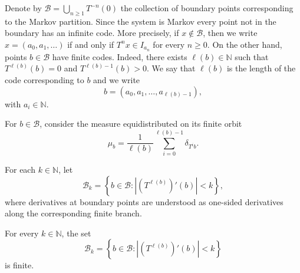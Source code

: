 \documentclass[letterpaper,11pt]{amsart}
\numberwithin{equation}{section}     %
\newcommand{\N}{\mathbb{N}}
\def\N{{\mathbb N}}
\def\B{{\mathcal B}}
\begin{document}
Denote by $\B= \bigcup_{n \geq 1} T^{-n}(0)$ the collection of boundary points corresponding to the Markov partition. Since the system is Markov every point not in the boundary has an infinite code. More precisely, if $x\not\in\B$, then we write $x=(a_0,a_1,\dots)$ if and only if $T^n x\in I_{a_n}$ for every $n\geq 0$. On the other hand, points $b \in \B$ have finite codes. Indeed, there exists $\ell(b) \in \N$ such that $T^{\ell(b)}(b)=0$ and $T^{\ell(b)-1}(b)>0$. We say that $\ell(b)$ is the length of the code corresponding to $b$ and we write
\begin{equation*}
b=(a_0, a_1, \dots , a_{\ell(b)-1}),
\end{equation*}
with $a_i \in \N$.

\begin{definition}
For $b \in \B$, consider the measure equidistributed on its finite orbit
\begin{equation*}
\mu_b= \frac{1}{\ell(b)} \sum_{i=0}^{\ell(b)-1} \delta_{T^i b}.
\end{equation*}
\end{definition}
For each $k \in \N$, let
\begin{equation*}
\B_k= \left\{b \in \B :	|(T^{\ell(b)})'(b)| < k 	\right\},
\end{equation*}
where derivatives at boundary points are understood as one-sided derivatives along the corresponding finite branch.



\begin{lemma}\label{lem:Bk-finite}
For every $k\in\mathbb N$, the set
\[
\mathcal B_k=
\left\{
b\in\mathcal B:
\left|(T^{\ell(b)})'(b)\right|<k
\right\}
\]
is finite.
\end{lemma}
\end{document}
